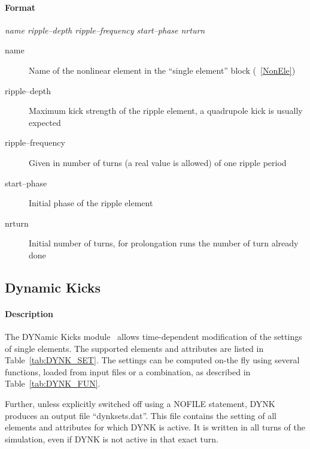 \documentclass[a4paper,11pt]{report}
\begin{document}
\paragraph{Format} {\em name ripple--depth ripple--frequency start--phase nrturn}

\begin{description}
\item [name] Name of the nonlinear element in the ``single element''
  block (~\ref{NonEle})
\item [ripple--depth] Maximum kick strength of the ripple element, a
  quadrupole kick is usually expected
\item [ripple--frequency] Given in number of turns (a real value is
  allowed) of one ripple period
\item [start--phase] Initial phase of the ripple element
\item [nrturn] Initial number of turns, for prolongation runs the
  number of turn already done
\end{description}


\subsection{Dynamic Kicks}
\label{sec:DYNK}

\paragraph{Description}
The DYNamic Kicks module~\cite{DYNKpaper} allows time-dependent modification of the settings of single elements.
The supported elements and attributes are listed in Table~\ref{tab:DYNK_SET}.
The settings can be computed on-the fly using several functions, loaded from input files or a combination, as described in Table~\ref{tab:DYNK_FUN}.

Further, unless explicitly switched off using a NOFILE statement, DYNK produces an output file ``dynksets.dat''.
This file contains the setting of all elements and attributes for which DYNK is active.
It is written in all turns of the simulation, even if DYNK is not active in that exact turn.
\end{document}
